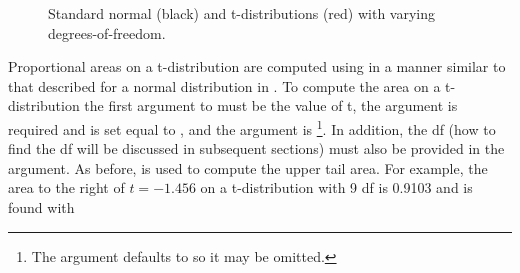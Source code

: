 \documentclass[10pt,openany]{book}\usepackage[]{graphicx}\usepackage[]{color}
\newenvironment{knitrout}{}{} %
\begin{document}
\begin{knitrout}
\color{fgcolor}




























\begin{figure}[hbtp]

{\centering {}

}

\caption[Standard normal (black) and t-distributions (red) with varying degrees-of-freedom]{Standard normal (black) and t-distributions (red) with varying degrees-of-freedom.}\label{fig:tvsZ}
\end{figure}


\end{knitrout}


Proportional areas on a t-distribution are computed using  in a manner similar to that described for a normal distribution in .  To compute the area on a t-distribution the first argument to  must be the value of t, the  argument is required and is set equal to , and the  argument is \footnote{The  argument defaults to  so it may be omitted.}.  In addition, the df (how to find the df will be discussed in subsequent sections) must also be provided in the  argument.  As before,  is used to compute the upper tail area.  For example, the area to the right of $t=-1.456$ on a t-distribution with 9 df is 0.9103  and is found with
\end{document}
